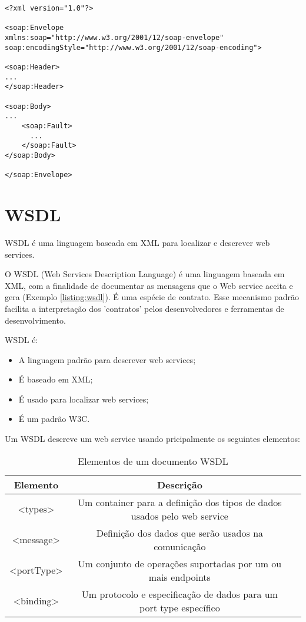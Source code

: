 \lstset{language=XML}
\begin{lstlisting}[caption={Estrutura de uma mensagem SOAP},frame=trBL,breaklines=true,label=listing:msgsoap]
<?xml version="1.0"?>

<soap:Envelope
xmlns:soap="http://www.w3.org/2001/12/soap-envelope"
soap:encodingStyle="http://www.w3.org/2001/12/soap-encoding">

<soap:Header>
...
</soap:Header>

<soap:Body>
...  
	<soap:Fault>
	  ...  
	</soap:Fault>
</soap:Body>

</soap:Envelope>
\end{lstlisting}

\section{WSDL}

WSDL é uma linguagem baseada em XML para localizar e descrever web services.

O WSDL (Web Services Description Language) é uma linguagem baseada em XML, com a finalidade de documentar as mensagens que o Web service aceita e gera (Exemplo \ref{listing:wsdl}). É uma espécie de contrato. Esse mecanismo padrão facilita a interpretação dos 'contratos' pelos desenvolvedores e ferramentas de desenvolvimento. 

WSDL é:

\begin {itemize}
	\item A linguagem padrão para descrever web services;
	\item É baseado em XML;
	\item É usado para localizar web services;
	\item É um padrão W3C.
\end {itemize}

Um WSDL descreve um web service usando pricipalmente os seguintes elementos:

\begin{table}[h]
	\caption{Elementos de um documento WSDL}
	\begin{center}
	\begin{tabular}{ccc}
		\hline
			\textbf{Elemento} & \textbf{Descrição} \\
		\hline
			<types> & Um container para a definição dos tipos de dados usados pelo web service\\
			<message> & Definição dos dados que serão usados na comunicação \\
			<portType> & Um conjunto de operações suportadas por um ou mais endpoints \\
			<binding> & Um protocolo e especificação de dados para um port type específico\\
		\hline
	\end {tabular}
	\end{center}
	\label{tab:elementosWsdl}
\end{table}


